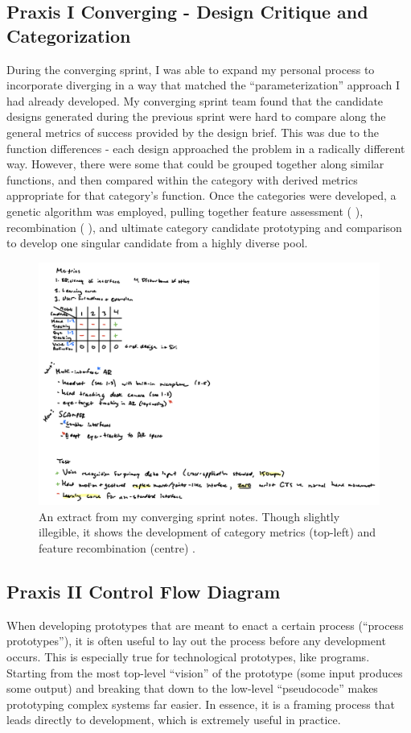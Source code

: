 \documentclass{report}
\newcommand{\myuline}[1]{%
  \uline{\phantom{#1}}%
  \llap{\contour{white}{#1}}%
}
\begin{document}
\subsection{Praxis I Converging - Design Critique and Categorization}
During the converging sprint, I was able to expand my personal process to 
incorporate diverging in a way that matched the “parameterization” approach 
I had already developed. My converging sprint team found that the candidate 
designs generated during the previous sprint were hard to compare along the 
general metrics of success provided by the design brief. This was due to the 
function differences - each design approached the problem in a radically 
different way. However, there were some that could be grouped together along 
similar functions, and then compared within the category with derived metrics 
appropriate for that category’s function. Once the categories were developed, 
a genetic algorithm was employed, pulling together feature assessment 
(\myuline{Pugh chart}), recombination (\myuline{MORPH chart}), and ultimate category candidate 
prototyping and comparison to develop one singular candidate from a highly 
diverse pool.

\begin{figure}[h]
    \centering
    \includegraphics[width=\textwidth/2]{images/algorithm.png}
    \hfill
    \caption{An extract from my converging sprint notes. Though slightly illegible, it shows the development of category metrics (top-left) and feature recombination (centre) \cite{designcrit}.}
\end{figure}

\subsection{Praxis II Control Flow Diagram}
When developing prototypes that are meant to enact a certain process (“process 
prototypes”), it is often useful to lay out the process before any development 
occurs. This is especially true for technological prototypes, like programs. 
Starting from the most top-level “vision” of the prototype (some input produces 
some output) and breaking that down to the low-level “pseudocode” makes 
prototyping complex systems far easier. In essence, it is a framing process that
leads directly to development, which is extremely useful in practice.
\end{document}
